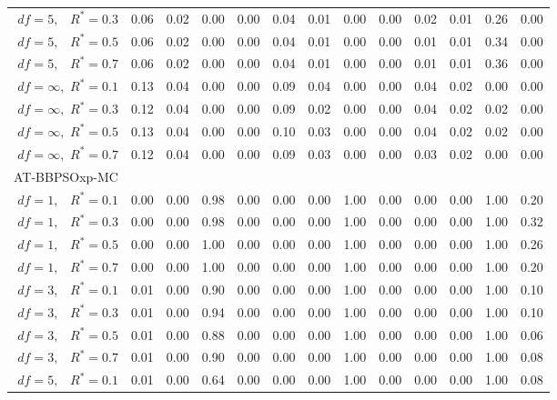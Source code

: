 \documentclass[12pt]{article}
\begin{document}
\begin{appendix}
\begin{table}[ht]
{\begin{tabular}{r|rrrr|rrrr|rrrr}
  $df = 5,\enspace$ $R^* =0.3$ & 0.06 & 0.02 & 0.00 & 0.00 & 0.04 & 0.01 & 0.00 & 0.00 & 0.02 & 0.01 & 0.26 & 0.00 \\ 
  $df = 5,\enspace$ $R^* =0.5$ & 0.06 & 0.02 & 0.00 & 0.00 & 0.04 & 0.01 & 0.00 & 0.00 & 0.01 & 0.01 & 0.34 & 0.00 \\ 
  $df = 5,\enspace$ $R^* =0.7$ & 0.06 & 0.02 & 0.00 & 0.00 & 0.04 & 0.01 & 0.00 & 0.00 & 0.01 & 0.01 & 0.36 & 0.00 \\ 
  $df = \infty,$ $R^* =0.1$ & 0.13 & 0.04 & 0.00 & 0.00 & 0.09 & 0.04 & 0.00 & 0.00 & 0.04 & 0.02 & 0.00 & 0.00 \\ 
  $df = \infty,$ $R^* =0.3$ & 0.12 & 0.04 & 0.00 & 0.00 & 0.09 & 0.02 & 0.00 & 0.00 & 0.04 & 0.02 & 0.02 & 0.00 \\ 
  $df = \infty,$ $R^* =0.5$ & 0.13 & 0.04 & 0.00 & 0.00 & 0.10 & 0.03 & 0.00 & 0.00 & 0.04 & 0.02 & 0.02 & 0.00 \\ 
  $df = \infty,$ $R^* =0.7$ & 0.12 & 0.04 & 0.00 & 0.00 & 0.09 & 0.03 & 0.00 & 0.00 & 0.03 & 0.02 & 0.00 & 0.00 \\ 
\hline
\multicolumn{1}{l|}{AT-BBPSOxp-MC} &&&&&&&&&&&&\\
  $df = 1,\enspace$ $R^* =0.1$ & 0.00 & 0.00 & 0.98 & 0.00 & 0.00 & 0.00 & 1.00 & 0.00 & 0.00 & 0.00 & 1.00 & 0.20 \\ 
  $df = 1,\enspace$ $R^* =0.3$ & 0.00 & 0.00 & 0.98 & 0.00 & 0.00 & 0.00 & 1.00 & 0.00 & 0.00 & 0.00 & 1.00 & 0.32 \\ 
  $df = 1,\enspace$ $R^* =0.5$ & 0.00 & 0.00 & 1.00 & 0.00 & 0.00 & 0.00 & 1.00 & 0.00 & 0.00 & 0.00 & 1.00 & 0.26 \\ 
  $df = 1,\enspace$ $R^* =0.7$ & 0.00 & 0.00 & 1.00 & 0.00 & 0.00 & 0.00 & 1.00 & 0.00 & 0.00 & 0.00 & 1.00 & 0.20 \\ 
  $df = 3,\enspace$ $R^* =0.1$ & 0.01 & 0.00 & 0.90 & 0.00 & 0.00 & 0.00 & 1.00 & 0.00 & 0.00 & 0.00 & 1.00 & 0.10 \\ 
  $df = 3,\enspace$ $R^* =0.3$ & 0.01 & 0.00 & 0.94 & 0.00 & 0.00 & 0.00 & 1.00 & 0.00 & 0.00 & 0.00 & 1.00 & 0.10 \\ 
  $df = 3,\enspace$ $R^* =0.5$ & 0.01 & 0.00 & 0.88 & 0.00 & 0.00 & 0.00 & 1.00 & 0.00 & 0.00 & 0.00 & 1.00 & 0.06 \\ 
  $df = 3,\enspace$ $R^* =0.7$ & 0.01 & 0.00 & 0.90 & 0.00 & 0.00 & 0.00 & 1.00 & 0.00 & 0.00 & 0.00 & 1.00 & 0.08 \\ 
  $df = 5,\enspace$ $R^* =0.1$ & 0.01 & 0.00 & 0.64 & 0.00 & 0.00 & 0.00 & 1.00 & 0.00 & 0.00 & 0.00 & 1.00 & 0.08 \\ 

\end{tabular}}
\end{table}
\end{appendix}
\end{document}

